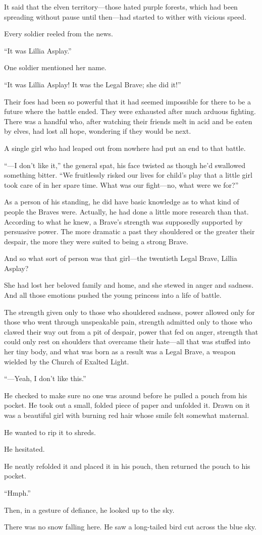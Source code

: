 It said that the elven territory—those hated purple forests, which had been spreading without pause until then—had started to wither with vicious speed.

Every soldier reeled from the news.

“It was Lillia Asplay.”

One soldier mentioned her name.

“It was Lillia Asplay! It was the Legal Brave; she did it!”

Their foes had been so powerful that it had seemed impossible for there to be a future where the battle ended. They were exhausted after much arduous fighting. There was a handful who, after watching their friends melt in acid and be eaten by elves, had lost all hope, wondering if they would be next.

A single girl who had leaped out from nowhere had put an end to that battle.

“—I don’t like it,” the general spat, his face twisted as though he’d swallowed something bitter. “We fruitlessly risked our lives for child’s play that a little girl took care of in her spare time. What was our fight—no, what were we for?”

As a person of his standing, he did have basic knowledge as to what kind of people the Braves were. Actually, he had done a little more research than that. According to what he knew, a Brave’s strength was supposedly supported by persuasive power. The more dramatic a past they shouldered or the greater their despair, the more they were suited to being a strong Brave.

And so what sort of person was that girl—the twentieth Legal Brave, Lillia Asplay?

She had lost her beloved family and home, and she stewed in anger and sadness. And all those emotions pushed the young princess into a life of battle.

The strength given only to those who shouldered sadness, power allowed only for those who went through unspeakable pain, strength admitted only to those who clawed their way out from a pit of despair, power that fed on anger, strength that could only rest on shoulders that overcame their hate—all that was stuffed into her tiny body, and what was born as a result was a Legal Brave, a weapon wielded by the Church of Exalted Light.

“—Yeah, I don’t like this.”

He checked to make sure no one was around before he pulled a pouch from his pocket. He took out a small, folded piece of paper and unfolded it. Drawn on it was a beautiful girl with burning red hair whose smile felt somewhat maternal.

He wanted to rip it to shreds.

He hesitated.

He neatly refolded it and placed it in his pouch, then returned the pouch to his pocket.

“Hmph.”

Then, in a gesture of defiance, he looked up to the sky.

There was no snow falling here. He saw a long-tailed bird cut across the blue sky.